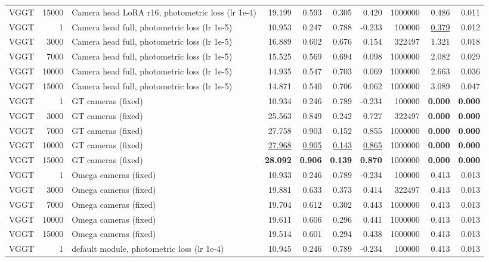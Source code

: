 \begin{table}[H]
\begin{tabular}{lrlrrrrrrr}
VGGT & 15000 & Camera head LoRA r16, photometric loss (lr 1e-4) & 19.199 & 0.593 & 0.305 & 0.420 & 1000000 & 0.486 & 0.011 \\
VGGT & 1 & Camera head full, photometric loss (lr 1e-5) & 10.953 & 0.247 & 0.788 & -0.233 & 100000 & \underline{0.379} & 0.012 \\
VGGT & 3000 & Camera head full, photometric loss (lr 1e-5) & 16.889 & 0.602 & 0.676 & 0.154 & 322497 & 1.321 & 0.018 \\
VGGT & 7000 & Camera head full, photometric loss (lr 1e-5) & 15.525 & 0.569 & 0.694 & 0.098 & 1000000 & 2.082 & 0.029 \\
VGGT & 10000 & Camera head full, photometric loss (lr 1e-5) & 14.935 & 0.547 & 0.703 & 0.069 & 1000000 & 2.663 & 0.036 \\
VGGT & 15000 & Camera head full, photometric loss (lr 1e-5) & 14.871 & 0.540 & 0.706 & 0.062 & 1000000 & 3.089 & 0.047 \\
VGGT & 1 & GT cameras (fixed) & 10.934 & 0.246 & 0.789 & -0.234 & 100000 & \textbf{0.000} & \textbf{0.000} \\
VGGT & 3000 & GT cameras (fixed) & 25.563 & 0.849 & 0.242 & 0.727 & 322497 & \textbf{0.000} & \textbf{0.000} \\
VGGT & 7000 & GT cameras (fixed) & 27.758 & 0.903 & 0.152 & 0.855 & 1000000 & \textbf{0.000} & \textbf{0.000} \\
VGGT & 10000 & GT cameras (fixed) & \underline{27.968} & \underline{0.905} & \underline{0.143} & \underline{0.865} & 1000000 & \textbf{0.000} & \textbf{0.000} \\
VGGT & 15000 & GT cameras (fixed) & \textbf{28.092} & \textbf{0.906} & \textbf{0.139} & \textbf{0.870} & 1000000 & \textbf{0.000} & \textbf{0.000} \\
VGGT & 1 & Omega cameras (fixed) & 10.933 & 0.246 & 0.789 & -0.234 & 100000 & 0.413 & 0.013 \\
VGGT & 3000 & Omega cameras (fixed) & 19.881 & 0.633 & 0.373 & 0.414 & 322497 & 0.413 & 0.013 \\
VGGT & 7000 & Omega cameras (fixed) & 19.704 & 0.612 & 0.302 & 0.443 & 1000000 & 0.413 & 0.013 \\
VGGT & 10000 & Omega cameras (fixed) & 19.611 & 0.606 & 0.296 & 0.441 & 1000000 & 0.413 & 0.013 \\
VGGT & 15000 & Omega cameras (fixed) & 19.514 & 0.601 & 0.294 & 0.438 & 1000000 & 0.413 & 0.013 \\
VGGT & 1 & default module, photometric loss (lr 1e-4) & 10.945 & 0.246 & 0.789 & -0.234 & 100000 & 0.413 & 0.013 \\

\end{tabular}
\end{table}

